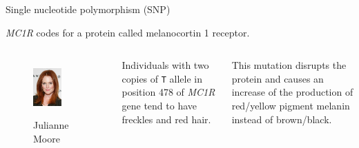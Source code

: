 \begin{frame}{Single nucleotide polymorphism (SNP)}
	\bigskip

	\textit{MC1R} codes for a protein called melanocortin 1 receptor.

	\begin{columns}
		
        	
		\begin{figure}
                	\includegraphics[width=0.6\textwidth]{Pics/red_hair} \
                	\caption{Julianne Moore}
        	\end{figure}


	        Individuals with two copies of \texttt{T} allele in position 478 of \textit{MC1R} 
		gene tend to have freckles and red hair.

		\bigskip

		This mutation disrupts the protein and causes an increase of the production 
		of red/yellow pigment melanin instead of brown/black.

	\end{columns}

\end{frame}


